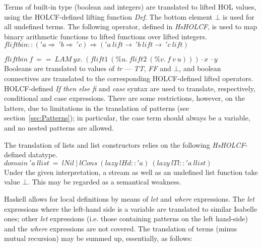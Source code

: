 \documentclass[a4paper,12pt]{article}
\begin{document}

Terms of built-in type (boolean and integers) are translated to lifted
HOL values, using the HOLCF-defined lifting function \emph{Def}.  The
bottom element $\bot$ is used for all undefined terms.  The following
operator, defined in \emph{HsHOLCF}, is used to map binary arithmetic
functions to lifted functions over
lifted integers.\\

$fliftbin :: ('a \Rightarrow \ 'b \Rightarrow \ 'c) 
  \Rightarrow ('a \ lift \to \ 'b \ lift \to \ 'c \ lift) $
 
$fliftbin \ f \ == \ LAM \ y x. \ (flift1 \ (\%u. \ flift2 \ (\%v. \ f \ v \ u))) \cdot x \ \cdot y $\\

\noindent Booleans are translated to values of \emph{tr} ---
\emph{TT}, \emph{FF} and $\bot$, and boolean connectives are
translated to the corresponding HOLCF-defined lifted operators.
HOLCF-defined \emph{If then else fi} and \emph{case} syntax are used
to translate, respectively, conditional and case expressions. There
are some restrictions, however, on the latters, due to limitations in
the translation of patterns (see section~\ref{sec:Patterns}); in
particular, the case term should always be a variable, and no nested
patterns are allowed.

The translation of lists and list constructors relies on the
following \emph{HsHOLCF}-defined datatype.\\

$domain \ 'a\ llist \ = \ lNil \ | \ lCons \ (lazy \ lHd ::'a) \ (lazy \ lTl ::'a \ llist) $\\

\noindent Under the given interpretation, a stream as well as an
undefined list function take value $\bot$. This may be regarded as a
semantical weakness.

Haskell allows for local definitions by means of \emph{let} and
\emph{where} expressions. The \emph{let} expressions where the
left-hand side is a variable are translated to similar Isabelle ones;
other \emph{let} expressions (i.e. those containing patterns on the
left hand-side) and the \emph{where} expressions are not covered. The
translation of terms (minus mutual recursion) may be summed up,
essentially, as follows:
\end{document}
